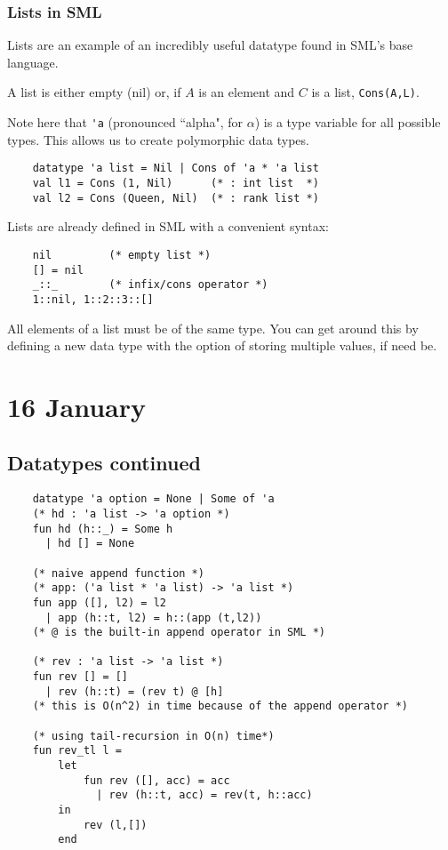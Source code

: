 \documentclass[11pt]{article}
\begin{document}
\subsubsection{Lists in SML}
Lists are an example of an incredibly useful datatype found in SML's base language.

A list is either empty (nil) or, if $A$ is an element and $C$ is a list, \verb!Cons(A,L)!.

Note here that \verb!'a! (pronounced ``alpha", for $\alpha$) is a type variable for all possible types. This allows us to create polymorphic data types.
\begin{verbatim}
    datatype 'a list = Nil | Cons of 'a * 'a list
    val l1 = Cons (1, Nil)      (* : int list  *)
    val l2 = Cons (Queen, Nil)  (* : rank list *)
\end{verbatim}

Lists are already defined in SML with a convenient syntax:
\begin{verbatim}
    nil         (* empty list *)
    [] = nil
    _::_        (* infix/cons operator *)
    1::nil, 1::2::3::[]
\end{verbatim}

All elements of a list must be of the same type. You can get around this by defining a new data type with the option of storing multiple values, if need be.

\section{16 January} %
\subsection{Datatypes continued}
\begin{verbatim}
    datatype 'a option = None | Some of 'a
    (* hd : 'a list -> 'a option *)
    fun hd (h::_) = Some h
      | hd [] = None
    
    (* naive append function *)
    (* app: ('a list * 'a list) -> 'a list *)
    fun app ([], l2) = l2
      | app (h::t, l2) = h::(app (t,l2))
    (* @ is the built-in append operator in SML *)
    
    (* rev : 'a list -> 'a list *)
    fun rev [] = []
      | rev (h::t) = (rev t) @ [h]
    (* this is O(n^2) in time because of the append operator *)
    
    (* using tail-recursion in O(n) time*)
    fun rev_tl l =
        let
            fun rev ([], acc) = acc
              | rev (h::t, acc) = rev(t, h::acc)
        in
            rev (l,[])
        end
\end{verbatim}
\end{document}
